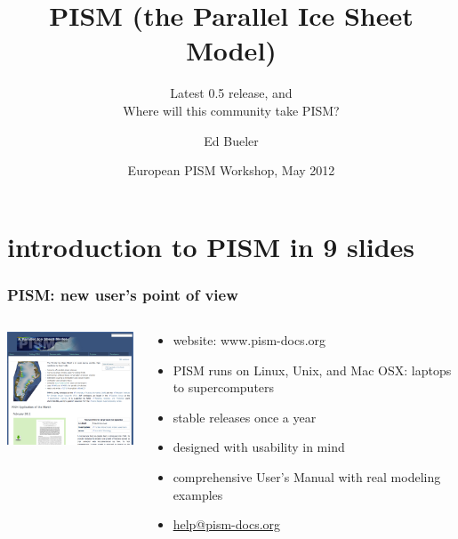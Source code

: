 \documentclass[hide notes,intlimits]{beamer}
\title[PISM (the Parallel Ice Sheet Model)] %
{PISM (the Parallel Ice Sheet Model)}
\subtitle{Latest 0.5 release, and \\ Where will this community take PISM?}
\author[Bueler]{Ed Bueler}
\institute{
University of Alaska Fairbanks
}
\date{European PISM Workshop, May 2012}
\begin{document}


{
} 

\begin{frame}
  \titlepage
\end{frame}

{
}

\section[introduction]{introduction to PISM in 9 slides}

\begin{frame}
  \frametitle{PISM: new user's point of view}
  \begin{columns}
    \begin{column}{50mm}
      \includegraphics[width=50mm]{pismdocs.png}
    \end{column}
    \begin{column}{70mm}
      \begin{itemize}
      \item website: \alert{www.pism-docs.org}
      \item PISM runs on Linux, Unix, and Mac OSX: laptops to supercomputers
      \item stable releases once a year
      \item designed with usability in mind
      \item comprehensive User's Manual with real modeling examples
      \item \url{help@pism-docs.org}
      \end{itemize}
    \end{column}
  \end{columns}
\end{frame}
\end{document}
